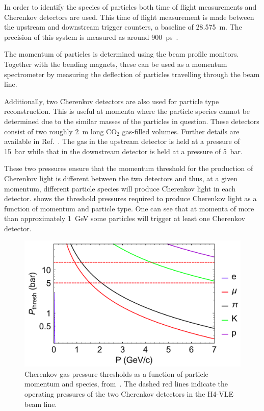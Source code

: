 In order to identify the species of particles both time of flight measurements and Cherenkov detectors are used.
This time of flight measurement is made between the upstream and downstream trigger counters, a baseline of \SI{28.575}{\m}.
The precision of this system is measured as around \SI{900}{\pico\second}~\cite{boothBeamLineInstr}.

The momentum of particles is determined using the beam profile monitors.
Together with the bending magnets, these can be used as a momentum spectrometer by measuring the deflection of particles travelling through the beam line.

Additionally, two Cherenkov detectors are also used for particle type reconstruction.
This is useful at momenta where the particle species cannot be determined due to the similar masses of the particles in question.
These detectors consist of two roughly \SI{2}{\m} long $\text{CO}_{2}$ gas-filled volumes. Further details are available in Ref.~\cite{vleCherenkov}.
The gas in the upstream detector is held at a pressure of \SI{15}{\bar} while that in the downstream detector is held at a pressure of \SI{5}{\bar}.

These two pressures ensure that the momentum threshold for the production of Cherenkov light is different between the two detectors and thus, at a given momentum, different particle species will produce Cherenkov light in each detector.
 shows the threshold pressures required to produce Cherenkov light as a function of momentum and particle type.
One can see that at momenta of more than approximately \SI{1}{\GeV} some particles will trigger at least one Cherenkov detector.

\begin{figure}[h]
	\centering
	\includegraphics[width=.6\linewidth]{files/figures/protodune_detector/cherenkovThresh}
	\caption[Cherenkov gas pressure thresholds as a function of particle momentum and species]{Cherenkov gas pressure thresholds as a function of particle momentum and species, from~\cite{boothBeamLineInstr}. The dashed red lines indicate the operating pressures of the two Cherenkov detectors in the H4-VLE beam line.}
	\label{fig:cherenkovThresh}
\end{figure}

